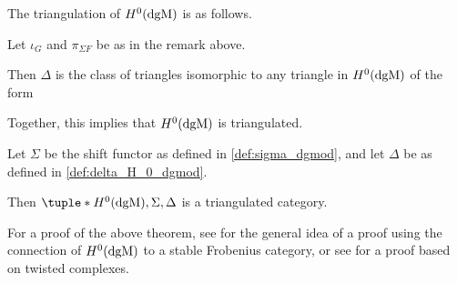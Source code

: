The triangulation of \( H^0(\operatorname{dgM}) \) is as follows.
\begin{definition}
    \label{def:delta_H_0_dgmod}
    Let \( \iota_G \) and \( \pi_{\Sigma F} \) be as in the remark above.

    Then \( \Delta \) is the class of triangles isomorphic to any triangle in \( H^0(\operatorname{dgM}) \) of the form
    \begin{center}
    \end{center}
\end{definition}

Together, this implies that \( H^0(\operatorname{dgM}) \) is triangulated.
\begin{theorem}
    Let \( \Sigma \) be the shift functor as defined in \autoref{def:sigma_dgmod}, and let \( \Delta \) be as defined in \autoref{def:delta_H_0_dgmod}.

    Then \( \tuple*{H^0(\dgM), \Sigma, \Delta} \) is a triangulated category.
\end{theorem}
For a proof of the above theorem, see \cite[p.\ 31]{Jasso-Muro_2023} for the general idea of a proof using the connection of \( H^0(\operatorname{dgM}) \) to a stable Frobenius category, or see \cite[Proposition 2, p.\ 97]{Bondal--Kapranov_1991} for a proof based on twisted complexes.





    

